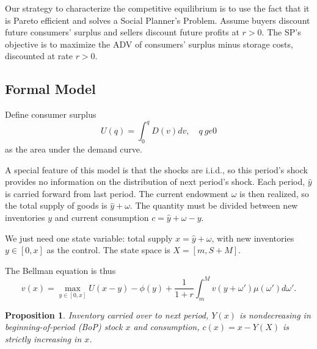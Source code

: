 \documentclass{tufte-handout}
\newtheorem{prop}[thm]{Proposition}
\theoremstyle{definition}
\begin{document}
Our strategy to characterize the competitive equilibrium is to use the fact that it is Pareto efficient and solves a Social Planner's Problem. Assume buyers discount future consumers' surplus and sellers discount future profits at $r > 0$. The SP's objective is to maximize the ADV of consumers' surplus minus storage costs, discounted at rate $r >0$.

\subsection{Formal Model}
Define consumer surplus \[
	U(q) = \int_{0}^{q} D(v)dv, \quad q\ ge 0 
\] as the area under the demand curve. 

A special feature of this model is that the shocks are i.i.d., so this period's shock provides no information on the distribution of next period's shock. Each period, $\hat{y}$ is carried forward from last period. The current endowment $\omega$ is then realized, so the total supply of goods is $\hat{y} + \omega$. The quantity must be divided between new inventories $y$ and current consumption $c = \hat{y} + \omega - y$. 

We just need one state variable: total supply $x = \hat{y}+\omega$, with new inventories $y \in \left[ 0,x \right] $ as the control. The state space is $X = \left[ m,S+M \right] $.

The Bellman equation is thus \[
	v(x) = \max_{y\in[0,x]} U(x-y) - \phi(y) + \frac{1}{1+r} \int_{m}^{M} v(y+\omega')\mu(\omega')d\omega' 
.\] 

\begin{prop}
	Inventory carried over to next period, $Y(x)$ is nondecreasing in beginning-of-period (BoP) stock $x$ and consumption, $c(x) = x-Y(X)$ is strictly increasing in $x$.
\end{prop}
\end{document}
